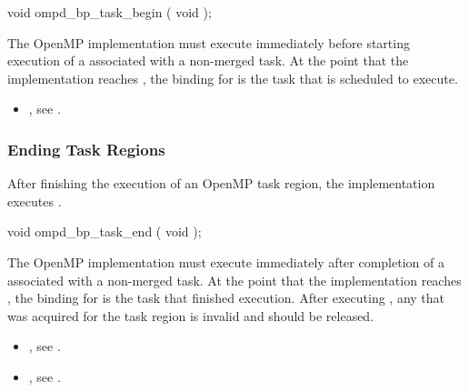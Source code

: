 \format
\begin{cspecific}
\begin{ompSyntax}
void ompd_bp_task_begin ( void );
\end{ompSyntax}
\end{cspecific}

\descr
The OpenMP implementation must execute  
immediately before starting execution of a  
associated with a non-merged task. At the point that the implementation 
reaches , the binding for 
 is the task that is scheduled to execute.

\crossreferences
\begin{itemize}
\item {}, 
see .
\end{itemize}



\subsubsection{Ending Task Regions}
\label{subsubsec:ompd_bp_task_end}

\summary
After finishing the execution of an OpenMP task region, 
the implementation executes .

\format
\begin{cspecific}
\begin{ompSyntax}
void ompd_bp_task_end ( void );
\end{ompSyntax}
\end{cspecific}

\descr
The OpenMP implementation must execute  immediately
after completion of a  associated with a non-merged task.
At the point that the implementation reaches , the 
binding for  is the task that finished execution.
After executing , any  that was acquired 
for the task region is invalid and should be released.

\crossreferences
\begin{itemize}
\item {}, 
see .

\item {}, see .
\end{itemize}



